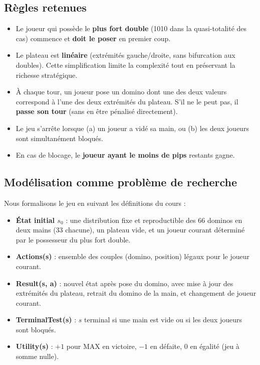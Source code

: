 \documentclass[11pt,a4paper]{article}
\begin{document}
\subsection{Règles retenues}

\begin{itemize}[leftmargin=*]
    \item Le joueur qui possède le \textbf{plus fort double} (10\textbar{}10 dans
          la quasi-totalité des cas) commence et \textbf{doit le poser} en premier coup.
    \item Le plateau est \textbf{linéaire} (extrémités gauche/droite, sans bifurcation
          aux doubles). Cette simplification limite la complexité tout en préservant
          la richesse stratégique.
    \item À chaque tour, un joueur pose un domino dont une des deux valeurs correspond
          à l'une des deux extrémités du plateau. S'il ne le peut pas, il \textbf{passe
          son tour} (sans en être pénalisé directement).
    \item Le jeu s'arrête lorsque (a) un joueur a vidé sa main, ou (b) les deux joueurs
          sont simultanément bloqués.
    \item En cas de blocage, le \textbf{joueur ayant le moins de pips} restants gagne.
\end{itemize}

\subsection{Modélisation comme problème de recherche}

Nous formalisons le jeu en suivant les définitions du cours :

\begin{itemize}[leftmargin=*]
    \item \textbf{État initial $s_0$} : une distribution fixe et reproductible des
          66 dominos en deux mains (33 chacune), un plateau vide, et un joueur
          courant déterminé par le possesseur du plus fort double.
    \item \textbf{Actions(s)} : ensemble des couples (domino, position) légaux pour
          le joueur courant.
    \item \textbf{Result(s, a)} : nouvel état après pose du domino, avec mise à jour
          des extrémités du plateau, retrait du domino de la main, et changement de
          joueur courant.
    \item \textbf{TerminalTest(s)} : $s$ terminal si une main est vide ou si les
          deux joueurs sont bloqués.
    \item \textbf{Utility(s)} : $+1$ pour MAX en victoire, $-1$ en défaite, $0$ en
          égalité (jeu à somme nulle).
\end{itemize}
\end{document}
